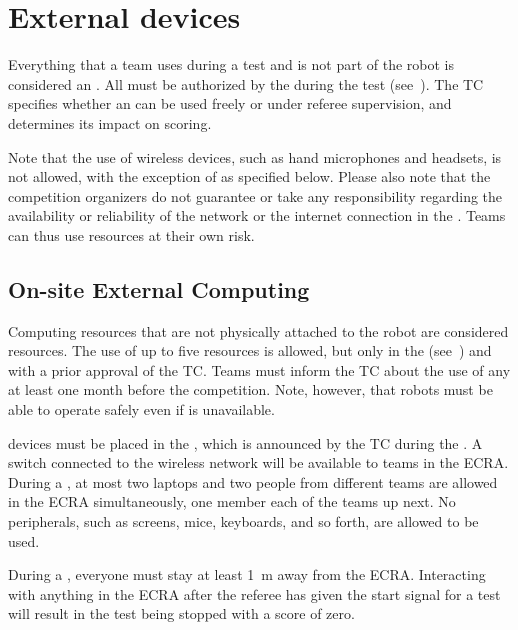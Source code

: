 %
%
\section{External devices}
\label{rule:robot_external_devices}

Everything that a team uses during a test and is not part of the robot is considered an \ExternalDevice.
All \ExternalDevices{} must be authorized by the \TC{} during the \RobotInspection{} test (see~).
The TC specifies whether an \ExternalDevice{} can be used freely or under referee supervision, and determines its impact on scoring.

Note that the use of wireless devices, such as hand microphones and headsets, is not allowed, with the exception of \ExternalComputing{} as specified below.
Please also note that the competition organizers do not guarantee or take any responsibility regarding the availability or reliability of the network or the internet connection in the \Arena{}.
Teams can thus use \ExternalComputing{} resources at their own risk.

\subsection{On-site External Computing}

Computing resources that are not physically attached to the robot are considered \ExternalComputing{} resources.
The use of up to five \ExternalComputing{} resources is allowed, but only in the \ArenaNetwork{} (see~) and with a prior approval of the TC.
Teams must inform the TC about the use of any \ExternalComputing{} at least one month before the competition.
Note, however, that robots must be able to operate safely even if \ExternalComputing{} is unavailable.

\ExternalComputing{} devices must be placed in the \ECRA{}, which is announced by the TC during the \SetupDays.
A switch connected to the \Arena{} wireless network will be available to teams in the ECRA.
During a \Testblock, at most two laptops and two people from different teams are allowed in the ECRA simultaneously, one member each of the teams up next.
No peripherals, such as screens, mice, keyboards, and so forth, are allowed to be used.

During a \Testslot, everyone must stay at least \SI{1}{\meter} away from the ECRA.
Interacting with anything in the ECRA after the referee has given the start signal for a test will result in the test being stopped with a score of zero.

